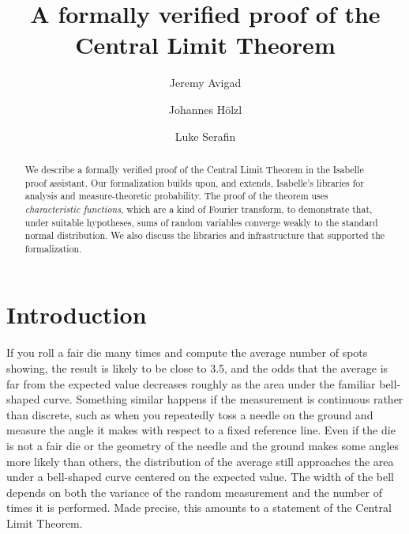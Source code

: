 \documentclass{svjour3}
\begin{document}
\title{A formally verified proof of the Central Limit Theorem}


\author{Jeremy Avigad \and Johannes H\"olzl \and Luke Serafin}


\maketitle

\begin{abstract}
We describe a formally verified proof of the Central Limit Theorem in the Isabelle proof assistant. Our formalization builds upon, and extends, Isabelle's libraries for analysis and measure-theoretic probability. 
The proof of the theorem uses \emph{characteristic functions}, which are a kind of Fourier transform, to demonstrate that, under suitable hypotheses, sums of random variables converge weakly to the standard normal distribution. We also discuss the libraries and infrastructure that supported the formalization.
\end{abstract}


\section{Introduction}
\label{section:introduction}

If you roll a fair die many times and compute the average number of spots showing, the result is likely to be close to 3.5, and the odds that the average is far from the expected value decreases roughly as the area under the familiar bell-shaped curve. Something similar happens if the measurement is continuous rather than discrete, such as when you repeatedly toss a needle on the ground and measure the angle it makes with respect to a fixed reference line. Even if the die is not a fair die or the geometry of the needle and the ground makes some angles more likely than others, the distribution of the average still approaches the area under a bell-shaped curve centered on the expected value. The width of the bell depends on both the variance of the random measurement and the number of times it is performed. Made precise, this amounts to a statement of the Central Limit Theorem.
\end{document}

